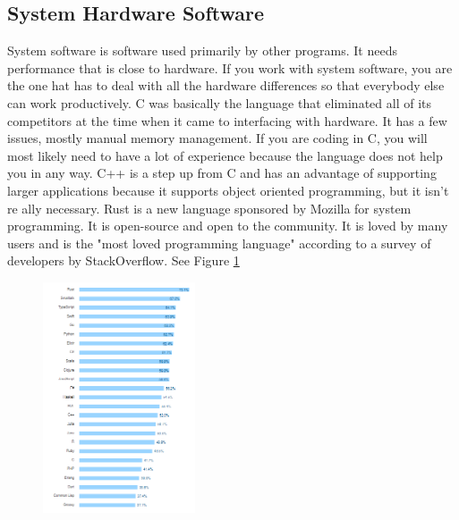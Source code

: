 \documentclass[letterpaper, 10 pt, conference]{IEEEtran}
\begin{document}
\subsection{System Hardware Software}
\indent System software is software used primarily by other programs. It needs performance that is close to hardware. If you work with system software, you are the one hat has to deal with all the hardware differences so that everybody else can work productively. C was basically the language that eliminated all of its competitors at the time when it came to interfacing with hardware. It has a few issues, mostly manual memory management. If you are coding in C, you will most likely need to have a lot of experience because the language does not help you in any way. C++ is a step up from C and has an advantage of supporting larger applications because it supports object oriented programming, but it isn't re ally necessary. Rust is a new language sponsored by Mozilla for system programming. It is open-source and open to the community. It is loved by many users and is the "most loved programming language" according to a survey of developers by StackOverflow. See Figure \ref{fig:Most Loved}
\begin{figure} [!ht]
\centering
\includegraphics[width=0.4\textwidth]{mostLoved.png}
\caption{}
\label{fig:Most Loved}
\end{figure}
\newline
\end{document}
